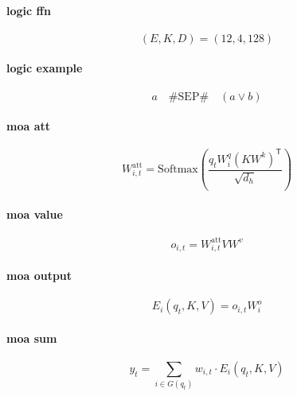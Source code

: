 \documentclass{article}
\begin{document}
\paragraph{logic ffn}
\[
(E,K,D)=(12,4,128)
\]

\paragraph{logic example}
\[
a\quad\#\mathrm{SEP}\#\quad(a\lor b)
\]

\paragraph{moa att}
\[
W_{i,t}^{\mathrm{att}}=\mathrm{Softmax}\!\left(\frac{q_t W_i^q(KW^k)^{\mathsf T}}{\sqrt{d_h}}\right)
\]

\paragraph{moa value}
\[
o_{i,t}=W_{i,t}^{\mathrm{att}}VW^v
\]

\paragraph{moa output}
\[
E_i(q_t,K,V)=o_{i,t}W_i^o
\]

\paragraph{moa sum}
\[
y_t=\sum_{i\in G(q_t)}w_{i,t}\cdot E_i(q_t,K,V)
\]
\end{document}
